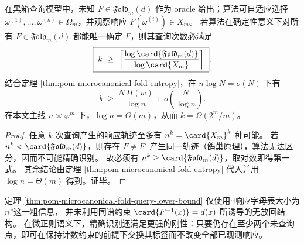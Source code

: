 \begin{theorem}\label{thm:pom-microcanonical-fold-query-lower-bound}
在黑箱查询模型中，未知 \(F\in\mathfrak{Fold}_m(d)\) 作为 oracle 给出；算法可自适应选择
\(\omega^{(1)},\dots,\omega^{(k)}\in\Omega_m\)，并观察响应 \(F(\omega^{(i)})\in X_m\)。
若算法在确定性意义下对所有 \(F\in\mathfrak{Fold}_m(d)\) 都能唯一确定 \(F\)，则其查询次数必满足
\[
\boxed{\;
k\ \ge\ \left\lceil \frac{\log\card{\mathfrak{Fold}_m(d)}}{\log\card{X_m}}\right\rceil\; } .
\]
结合定理 \ref{thm:pom-microcanonical-fold-entropy}，在 \(n\log N=o(N)\) 下有
\[
k\ \ge\ \frac{N\,H(w)}{\log n}+o\!\left(\frac{N}{\log n}\right).
\]
在本文主线 \(n\asymp\varphi^m\) 下，\(\log n=\Theta(m)\)，从而 \(k=\Omega(2^m/m)\)。
\end{theorem}
\begin{proof}
任意 \(k\) 次查询产生的响应轨迹至多有 \(n^k=\card{X_m}^k\) 种可能。
若 \(n^k<\card{\mathfrak{Fold}_m(d)}\)，则存在 \(F\neq F'\) 产生同一轨迹（鸽巢原理），算法无法区分，因而不可能精确识别。
故必须有 \(n^k\ge \card{\mathfrak{Fold}_m(d)}\)，取对数即得第一式。
其余结论由定理 \ref{thm:pom-microcanonical-fold-entropy} 代入并用 \(\log n=\Theta(m)\) 得到。证毕。
\end{proof}

\begin{remark}[计数下界与查询刚性]
定理 \ref{thm:pom-microcanonical-fold-query-lower-bound} 仅使用“响应字母表大小为 \(n\)”这一粗信息，
并未利用同谱约束 \(\card{F^{-1}(x)}=d(x)\) 所诱导的无放回结构。
在微正则语义下，精确识别还满足更强的刚性：只要仍存在至少两个未查询点，即可在保持计数约束的前提下交换其标签而不改变全部已观测响应。
\end{remark}

